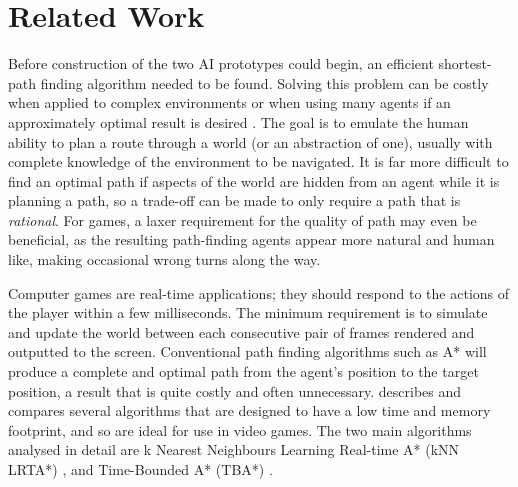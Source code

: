 \documentclass[a4paper,12pt]{article}
\begin{document}
\section{Related Work}
Before construction of the two AI prototypes could begin, an efficient shortest-path finding algorithm needed to be found. Solving this problem can be costly when applied to complex environments or when using many agents if an approximately optimal result is desired \cite[p.~95-99]{russell10}. The goal is to emulate the human ability to plan a route through a world (or an abstraction of one), usually with complete knowledge of the environment to be navigated. It is far more difficult to find an optimal path if aspects of the world are hidden from an agent while it is planning a path, so a trade-off can be made to only require a path that is \emph{rational}. For games, a laxer requirement for the quality of path may even be beneficial, as the resulting path-finding agents appear more natural and human like, making occasional wrong turns along the way.

Computer games are real-time applications; they should respond to the actions of the player within a few milliseconds. The minimum requirement is to simulate and update the world between each consecutive pair of frames rendered and outputted to the screen. Conventional path finding algorithms such as A* \cite{hart68} will produce a complete and optimal path from the agent's position to the target position, a result that is quite costly and often unnecessary.  describes and compares several algorithms that are designed to have a low time and memory footprint, and so are ideal for use in video games. The two main algorithms analysed in detail are k Nearest Neighbours Learning Real-time A* (kNN LRTA*) \cite{bulitko09}, and Time-Bounded A* (TBA*) \cite{bjornsson09}.
\end{document}
